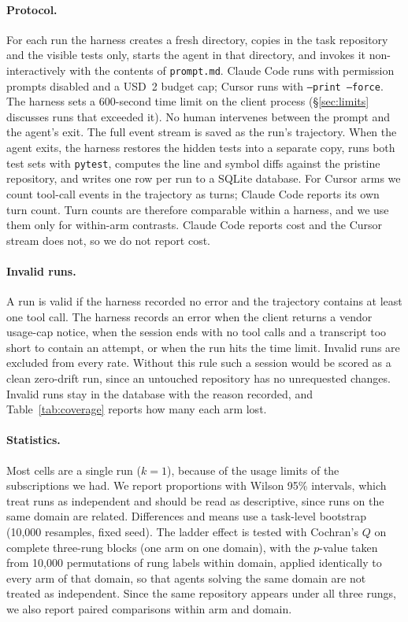 \paragraph{Protocol.} For each run the harness creates a fresh directory,
copies in the task repository and the visible tests only, starts the agent
in that directory, and invokes it non-interactively with the contents of \texttt{prompt.md}. Claude Code
runs with permission prompts disabled and a USD~2 budget cap; Cursor runs
with \texttt{--print --force}. The harness sets a 600-second time limit on the client process
(\S\ref{sec:limits} discusses runs that exceeded it). No
human intervenes between the prompt and the agent's exit. The full event
stream is saved as the run's trajectory. When the agent exits, the harness
restores the hidden tests into a separate copy, runs both test sets with
\texttt{pytest}, computes the line and symbol diffs against the pristine
repository, and writes one row per run to a SQLite database. For Cursor arms we
count tool-call events in the trajectory as turns; Claude Code reports its
own turn count. Turn counts are therefore comparable within a harness, and we
use them only for within-arm contrasts. Claude Code reports cost and the
Cursor stream does not, so we do not report cost.

\paragraph{Invalid runs.} A run is valid if the harness recorded no error and
the trajectory contains at least one tool call. The harness records an error
when the client returns a vendor usage-cap notice, when the session ends with
no tool calls and a transcript too short to contain an attempt, or when the
run hits the time limit. Invalid runs are excluded from every rate.
Without this rule such a session would be scored as a clean zero-drift run,
since an untouched repository has no unrequested changes. Invalid runs stay in
the database with the reason recorded, and Table~\ref{tab:coverage} reports
how many each arm lost.

\paragraph{Statistics.} Most cells are a single run ($k=1$), because of the
usage limits of the subscriptions we had. We report proportions with Wilson
95\% intervals, which treat runs as independent and should be read as
descriptive, since runs on the same domain are related. Differences and means
use a task-level bootstrap (10{,}000 resamples, fixed seed). The ladder effect is tested with Cochran's $Q$ on complete three-rung
blocks (one arm on one domain), with the $p$-value taken from 10{,}000
permutations of rung labels within domain, applied identically to every arm
of that domain, so that agents solving the same domain are not treated as
independent. Since the same repository appears under all three rungs, we also
report paired comparisons within arm and domain.
